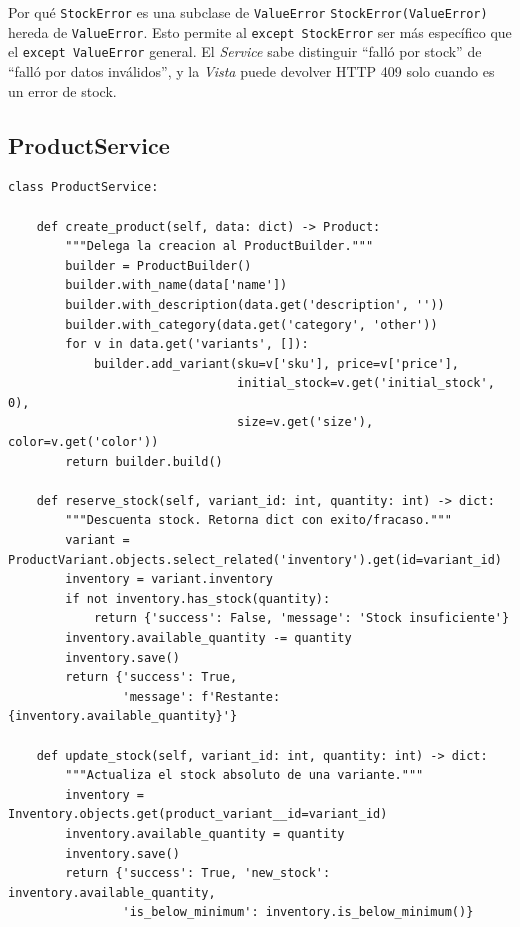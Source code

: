 \documentclass[12pt, a4paper]{article}
\begin{document}
\begin{conceptbox}{Por qué \texttt{StockError} es una subclase de \texttt{ValueError}}
\texttt{StockError(ValueError)} hereda de \texttt{ValueError}. Esto permite al
\texttt{except StockError} ser más específico que el \texttt{except ValueError}
general. El \textit{Service} sabe distinguir ``falló por stock'' de ``falló por
datos inválidos'', y la \textit{Vista} puede devolver HTTP 409 solo cuando es
un error de stock.
\end{conceptbox}

\subsection{ProductService}

\begin{lstlisting}[caption={products/services.py -- Métodos principales}]
class ProductService:

    def create_product(self, data: dict) -> Product:
        """Delega la creacion al ProductBuilder."""
        builder = ProductBuilder()
        builder.with_name(data['name'])
        builder.with_description(data.get('description', ''))
        builder.with_category(data.get('category', 'other'))
        for v in data.get('variants', []):
            builder.add_variant(sku=v['sku'], price=v['price'],
                                initial_stock=v.get('initial_stock', 0),
                                size=v.get('size'), color=v.get('color'))
        return builder.build()

    def reserve_stock(self, variant_id: int, quantity: int) -> dict:
        """Descuenta stock. Retorna dict con exito/fracaso."""
        variant = ProductVariant.objects.select_related('inventory').get(id=variant_id)
        inventory = variant.inventory
        if not inventory.has_stock(quantity):
            return {'success': False, 'message': 'Stock insuficiente'}
        inventory.available_quantity -= quantity
        inventory.save()
        return {'success': True,
                'message': f'Restante: {inventory.available_quantity}'}

    def update_stock(self, variant_id: int, quantity: int) -> dict:
        """Actualiza el stock absoluto de una variante."""
        inventory = Inventory.objects.get(product_variant__id=variant_id)
        inventory.available_quantity = quantity
        inventory.save()
        return {'success': True, 'new_stock': inventory.available_quantity,
                'is_below_minimum': inventory.is_below_minimum()}
\end{lstlisting}
\end{document}
